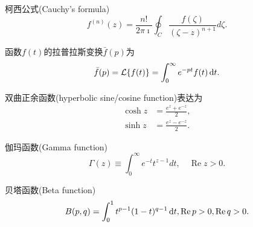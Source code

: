 \documentclass{njustexam}
\begin{document}




\newpage
{} %
柯西公式(Cauchy's formula)
\[
  f^{(n)}(z) = \frac{n!}{2\pi \imath} \oint_C \frac{f(\zeta)}{(\zeta - z)^{n+1}} d \zeta. 
  \label{eq:cauchy_formula_nth_derivative}
\]

\smallskip
函数$f(t)$的拉普拉斯变换$\bar{f}(p)$为
\[
    \bar{f}(p) = \mathcal{L} \{ f(t) \} = \int_0 ^{\infty} e^{-pt} f(t) \mathop{}\!\mathrm{d} t . 
\]

\smallskip

双曲正余函数(hyperbolic sine/cosine function)表达为
\begin{align*}
    \cosh z&= \frac{e^{z} + e^{ - z} }{2} , 
    \\
    \sinh z &= \frac{e^{z} - e^{ - z} }{2} . 
\end{align*}

伽玛函数(Gamma function)
\[
  \Gamma(z) \equiv \int_{0}^{\infty} e^{-t} t^{z-1} d t,  \quad \operatorname{Re} z>0 . 
\]
\smallskip

贝塔函数(Beta function)
\[
    B(p,  q) = \int_0^1 t^{p -1} (1-t)^{q-1} \mathop{}\!\mathrm{d} t,  \operatorname{Re} p> 0,  \operatorname{Re} q >0. 
    \label{eq:beta_def1}
\]
\smallskip
\end{document}
